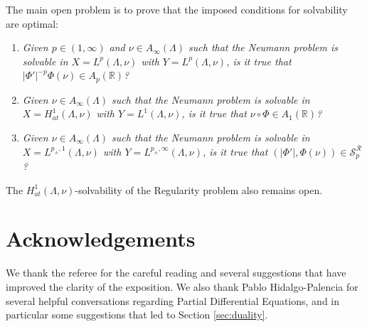 \documentclass[12pt]{amsart}
\newcommand{\R}{\mathbb{R}}
\theoremstyle{plain}
\theoremstyle{definition}
\numberwithin{equation}{section}
\begin{document}
The main open problem is to prove that the imposed conditions  for solvability are optimal:
\begin{enumerate}
    \item \textit{Given $p\in (1,\infty)$ and $\nu\in A_{\infty}(\Lambda)$ such that the Neumann problem is solvable in $X=L^p(\Lambda, \nu)$ with $Y=L^p(\Lambda, \nu)$, is it true that $|\Phi'|^{-p}\Phi(\nu)\in A_p(\R)$?}

    \item \textit{Given $\nu\in A_{\infty}(\Lambda)$ such that the Neumann problem is solvable in $X=H_{at}^{1}(\Lambda, \nu)$ with $Y=L^1(\Lambda, \nu)$, is it true that $\nu\circ\Phi\in A_1(\R)$?}
    
    \item \textit{Given $\nu\in A_{\infty}(\Lambda)$ such that the Neumann problem is solvable in $X=L^{p_{\pm},1}(\Lambda, \nu)$ with $Y=L^{p_{\pm},\infty}(\Lambda, \nu)$, is it true that $(|\Phi'|,\Phi(\nu))\in \mathcal{S}_p^{\mathcal{R}}$?}
\end{enumerate}

The $H_{at}^{1}(\Lambda,\nu)$-solvability of the Regularity problem also remains open.





\section*{Acknowledgements}

We thank the referee for the careful reading and several suggestions that have improved the clarity of the exposition. We also thank Pablo Hidalgo-Palencia for several helpful conversations regarding Partial Differential Equations, and in particular some suggestions that led to Section \ref{sec:duality}.
\end{document}
